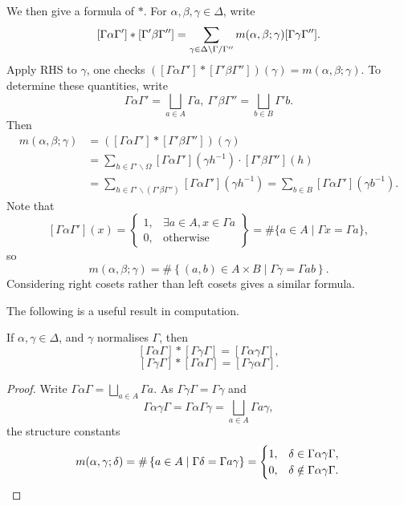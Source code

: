 We then give a formula of $*$.
For $\alpha, \beta, \gamma\in\Delta$, write
\[[\Gamma\alpha\Gamma']*[\Gamma'\beta\Gamma''] = \sum_{\gamma\in {\Delta}\backslash {\Gamma}\slash {\Gamma''}} m(\alpha, \beta; \gamma) [\Gamma\gamma\Gamma''].\]
Apply RHS to $\gamma$, one checks $\left([\Gamma\alpha\Gamma']*[\Gamma'\beta\Gamma'']\right)(\gamma) = m(\alpha, \beta; \gamma)$.
To determine these quantities,
write \[\Gamma\alpha\Gamma' = \bigsqcup_{a\in A} \Gamma a,\ \Gamma'\beta\Gamma'' = \bigsqcup_{b\in B}\Gamma' b.\]
Then\begin{align*}
    m(\alpha, \beta; \gamma) &= \left([\Gamma\alpha\Gamma']*[\Gamma'\beta\Gamma'']\right)(\gamma)\\
    &= \sum_{h\in\Gamma'\backslash\Omega}[\Gamma\alpha\Gamma'](\gamma h^{-1})\cdot [\Gamma'\beta\Gamma''](h)\\
    &= \sum_{h\in\Gamma'\backslash (\Gamma'\beta\Gamma'')} [\Gamma\alpha\Gamma'](\gamma h^{-1}) = \sum_{b\in B} [\Gamma\alpha\Gamma'](\gamma b^{-1}).
\end{align*}
Note that \[[\Gamma\alpha\Gamma'](x) =
\left\{ \begin{matrix}
    1, &\exists a\in A, x\in \Gamma a\\
    0, &\text{otherwise} 
\end{matrix} \right\} =  \#\{a\in A \mid \Gamma x = \Gamma a\},\]
so \[m(\alpha, \beta; \gamma)= \#\left\{ (a, b)\in A\times B\mid \Gamma \gamma = \Gamma ab \right\}.\]
Considering right cosets rather than left cosets gives a similar formula.

The following is a useful result in computation.
\begin{proposition}\label{alpha * beta = alpha beta if normalises}
    If $\alpha, \gamma\in\Delta$, and $\gamma$ normalises $\Gamma$, then \[[\Gamma\alpha\Gamma]*[\Gamma\gamma\Gamma] = [\Gamma\alpha\gamma\Gamma],\]
    \[[\Gamma\gamma\Gamma]*[\Gamma\alpha\Gamma] = [\Gamma\gamma\alpha\Gamma].\]
\end{proposition}
\begin{proof}
    Write $\Gamma\alpha\Gamma = \bigsqcup_{a\in A}\Gamma a$.
    As $\Gamma\gamma\Gamma = \Gamma\gamma$
    and \[\Gamma\alpha\gamma\Gamma = \Gamma\alpha\Gamma\gamma = \bigsqcup_{a\in A}\Gamma a\gamma,\]
    the structure constants\[
        m(\alpha, \gamma; \delta) = \#\left\{ a\in A\mid \Gamma\delta = \Gamma a\gamma \right\} = \begin{cases}
            1, &\delta\in\Gamma\alpha\gamma\Gamma,\\
            0, &\delta\notin\Gamma\alpha\gamma\Gamma.
        \end{cases}
    \qedhere\]
\end{proof}

